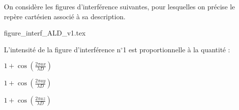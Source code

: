 
\finEntrainement






\hauteurLargeurCadreReponse		{6mm}{1.5cm}
\initialisationEntrainement

On considère les figures d'interférence suivantes, pour lesquelles on précise le repère cartésien associé à sa description. 

\begin{center}
	{figure_interf_ALD_v1.tex}
\end{center}


\debutEntrainement


\begin{enonce}
	L'intensité de la figure d'interférence n$^\circ$1 est proportionnelle à la quantité : 
	
	\begin{listeQCM3Colonnes}
	\item $1+ \cos \left(\frac{2\pi a x}{\lambda D} \right)$
	\item $1+ \cos \left(\frac{2\pi a y}{\lambda D} \right)$
	\item $1+ \cos \left(\frac{2\pi a z}{\lambda D} \right)$
	\end{listeQCM3Colonnes}

\end{enonce}

\reponse{\reponseA{}}

